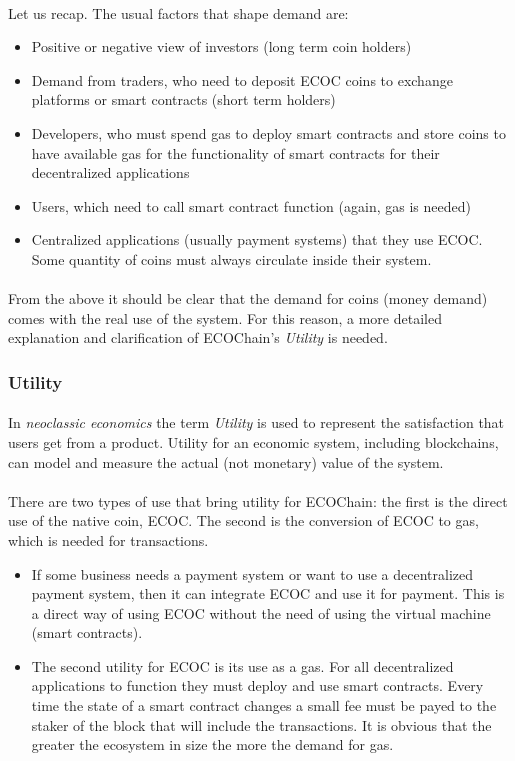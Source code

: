 \documentclass{article}
\begin{document}
\paragraph{}
Let us recap. The usual factors that shape demand are:
\begin{itemize}
  \item Positive or negative view of investors (long term coin holders)
  \item Demand from traders, who need to deposit ECOC coins to exchange platforms or smart contracts (short term holders)
  \item Developers, who must spend gas to deploy smart contracts and store coins to have available gas for the functionality of smart contracts for their decentralized applications
  \item Users, which need to call smart contract function (again, gas is needed)
  \item Centralized applications (usually payment systems) that they use ECOC. Some quantity of coins must always circulate inside their system. 
\end{itemize}
\paragraph{}
From the above it should be clear that the demand for coins (money demand) comes with the real use of the system. For this reason, a more detailed explanation and clarification of ECOChain's \emph{Utility} is needed.

\subsubsection{Utility}
\paragraph{}
In \emph{neoclassic economics} the term \emph{Utility} is used to represent the satisfaction that users get from a product. Utility for an economic system, including blockchains, can model and measure the actual (not monetary) value of the system.
\paragraph{}
There are two types of use that bring utility for ECOChain: the first is the direct use of the native coin, ECOC. The second is the conversion of ECOC to gas, which is needed for transactions.
\begin{itemize}
  \item
  If some business needs a payment system or want to use a decentralized payment system, then it can integrate ECOC and use it for payment. This is a direct way of using ECOC without the need of using the virtual machine (smart contracts). 
  \item
  The second utility for ECOC is its use as a gas. For all decentralized applications to function they must deploy and use smart contracts. Every time the state of a smart contract changes a small fee must be payed to the staker of the block that will include the transactions. It is obvious that the greater the ecosystem in size the more the demand for gas.
\end{itemize}
\end{document}
